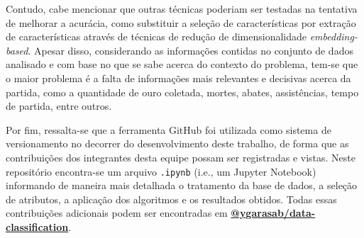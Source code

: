 \documentclass[12pt]{article}
\begin{document}
Contudo, cabe mencionar que outras técnicas poderiam ser testadas na tentativa de melhorar a acurácia, como substituir a seleção de características por extração de características através de técnicas de redução de dimensionalidade \textit{embedding-based}. Apesar disso, considerando as informações contidas no conjunto de dados analisado e com base no que se sabe acerca do contexto do problema, tem-se que o maior problema é a falta de informações mais relevantes e decisivas acerca da partida, como a quantidade de ouro coletada, mortes, abates, assistências, tempo de partida, entre outros. 

Por fim, ressalta-se que a ferramenta GitHub foi utilizada como sistema de versionamento no decorrer do desenvolvimento deste trabalho, de forma que as contribuições dos integrantes desta equipe possam ser registradas e vistas. Neste repositório encontra-se um arquivo \texttt{.ipynb} (i.e., um Jupyter Notebook) informando de maneira mais detalhada o tratamento da base de dados, a seleção de atributos, a aplicação dos algoritmos e os resultados obtidos. Todas essas contribuições adicionais podem ser encontradas em \textbf{\href{https://github.com/ygarasab/data-classification}{@ygarasab/data-classification}}.




\end{document}
